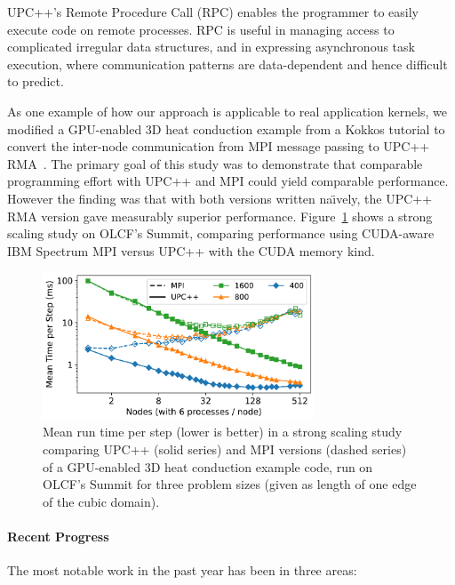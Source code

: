 UPC++'s Remote Procedure Call (RPC)
enables the programmer
to easily execute code on remote processes.
RPC is useful in managing access to complicated irregular data structures,
and in expressing asynchronous task execution, where communication patterns
are data-dependent and hence difficult to predict.

As one example of how our approach is applicable to real application kernels,
we modified a GPU-enabled 3D heat conduction example from a Kokkos tutorial to
convert the inter-node communication from MPI message passing to UPC++
RMA~\cite{pawatm21-upcxx-kokkos}.  The primary goal of this study was to
demonstrate that comparable programming effort with UPC++ and MPI could yield
comparable performance. However the finding was that with both versions written
na\"{\i}vely, the UPC++ RMA version gave measurably superior performance.
Figure~\ref{fig:paw21_interop_strong_scaling} shows a strong scaling study on
OLCF's Summit, comparing performance using 
CUDA-aware IBM Spectrum MPI versus UPC++ with the CUDA memory kind.

\begin{figure}[htb]
  \centering
  \captionsetup{width=0.85\linewidth}
  \includegraphics[width=0.72\textwidth]{projects/2.3.1-PMR/2.3.1.14-UPCxx-GASNet/paw21_interop_strong_scaling1.pdf}
  \caption{Mean run time per step (lower is better) in a strong scaling study
    comparing UPC++ (solid series) and MPI versions (dashed series) of a
    GPU-enabled 3D heat conduction example code, run on OLCF's Summit for three
    problem sizes (given as length of one edge of the cubic domain).}
  \label{fig:paw21_interop_strong_scaling}
\end{figure}


\paragraph{Recent Progress}

The most notable work in the past year has been in three areas:

